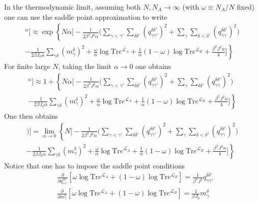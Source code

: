 \documentclass[onecolumn,superscriptaddress,pr]{revtex4}
\def\tr{\textrm{Tr}}
\begin{document}
In the thermodynamic limit, assuming both $N,N_A\to\infty$ (with $\omega\equiv 
N_A/N$ fixed) one can use the saddle point approximation to write 
%
\begin{multline}
[Z[A,n,\beta]^\alpha]\approx
\exp\left\{N\alpha\Big[-\frac{1}{2\beta^2J^2\alpha}\Big(\sum\limits_{\gamma<\gamma'}
\sum\limits_{\delta\delta'} (q_{\gamma\gamma'}^{\delta\delta'})^2
+\sum\limits_{\gamma}\sum\limits_{\delta<\delta'}(q_{\gamma\gamma}^{
\delta\delta'})^2
\Big)\right.
\\\left.-\frac{1}{2\beta J_0\alpha}\sum\limits_{\gamma\delta}(m_\gamma^\delta)^2
+\frac{\omega}{\alpha}\log\tr e^{{\mathcal L}_A}+\frac{1}{\alpha}(1-\omega)
\log\tr e^{{\mathcal L}_B}+\frac{\beta^2J^2n}{4}\Big]\right\}
\end{multline}
%
For finite large $N$, taking the limit $\alpha\to 0$ one obtains 
%
\begin{multline}
[Z[A,n,\beta]^\alpha]\approx 1+
\left\{N\alpha\Big[-\frac{1}{2\beta^2J^2\alpha}\Big(\sum\limits_{\gamma<\gamma'}
\sum\limits_{\delta\delta'} (q_{\gamma\gamma'}^{\delta\delta'})^2
+\sum\limits_{\gamma}\sum\limits_{\delta\delta'}(q_{\gamma\gamma}^{
\delta\delta'})^2
\Big)\right.
\\\left.-\frac{1}{2\beta J_0\alpha}\sum\limits_{\gamma\delta}(m_\gamma^\delta)^2
+\frac{\omega}{\alpha}\log\tr e^{{\mathcal L}_A}+\frac{1}{\alpha}(1-\omega)
\log\tr e^{{\mathcal L}_B}+\frac{\beta^2J^2n}{4}\Big]\right\}
\end{multline}
%
One then obtains 
%
\begin{multline}
[\log(Z[A,n,\beta])]=\lim_{\alpha\to 0}\left\{N\Big[
-\frac{1}{2\beta^2J^2\alpha}\Big(\sum\limits_{\gamma<\gamma'}
\sum\limits_{\delta\delta'} (q_{\gamma\gamma'}^{\delta\delta'})^2
+\sum\limits_{\gamma}\sum\limits_{\delta<\delta'}(q_{\gamma
\gamma}^{\delta\delta'})^2\Big)\right.
\\\left.-\frac{1}{2\beta J_0\alpha}\sum\limits_{\gamma\delta}(
m_\gamma^\delta)^2+\frac{\omega}{\alpha}\log\tr e^{{\mathcal L}_A}+
\frac{1}{\alpha}(1-\omega)\log\tr e^{{\mathcal L}_B}+\frac{\beta^2J^2n}{4}\Big]\right\}
\end{multline}
%
Notice that one has to impose the saddle point conditions 
%
\begin{align}
& \frac{\partial}{\partial q_{\gamma\gamma'}^{\delta\delta'}}
\left[\omega\log\tr e^{{\mathcal L}_A}+(1-\omega)\log\tr 
e^{{\mathcal L}_B}\right]=\frac{1}{\beta^2J^2}
q_{\gamma\gamma'}^{\delta\delta'}\\
& \frac{\partial}{\partial m_\gamma^\delta}\left[\omega\log\tr 
e^{{\mathcal L}_A}+(1-\omega)\log\tr e^{{\mathcal L}_B}\right]=
\frac{1}{\beta J_0}m_\gamma^\delta
\end{align}
\end{document}
